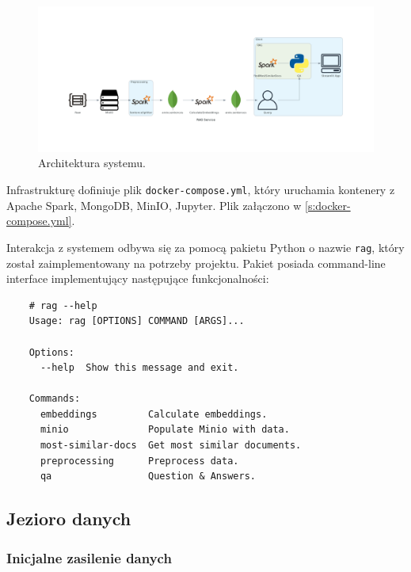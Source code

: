 \documentclass[10pt]{article}
\begin{document}
\begin{figure}[h]
    \centering
    \includegraphics[width=1.0\textwidth]{images/architecture.png}
    \caption{Architektura systemu.}
    \label{fig:architecture}
\end{figure}


Infrastrukturę dofiniuje plik \texttt{docker-compose.yml}, który uruchamia kontenery z Apache Spark, MongoDB, MinIO, Jupyter. Plik załączono w \ref{s:docker-compose.yml}.

Interakcja z systemem odbywa się za pomocą pakietu Python o nazwie \texttt{rag}, który został zaimplementowany na potrzeby projektu. Pakiet posiada command-line interface implementujący następujące funkcjonalności:

\begin{lstlisting}
    # rag --help
    Usage: rag [OPTIONS] COMMAND [ARGS]...
    
    Options:
      --help  Show this message and exit.
    
    Commands:
      embeddings         Calculate embeddings.
      minio              Populate Minio with data.
      most-similar-docs  Get most similar documents.
      preprocessing      Preprocess data.
      qa                 Question & Answers.
\end{lstlisting}

\subsection{Jezioro danych}

\subsubsection{Inicjalne zasilenie danych}
\end{document}
